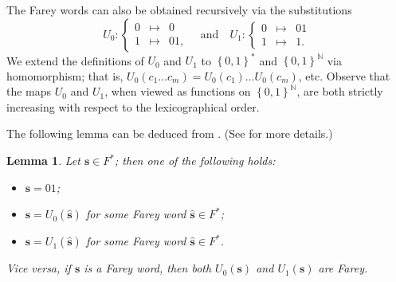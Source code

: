 \documentclass[11pt]{amsart}
\newtheorem{lemma}[theorem]{Lemma}
\theoremstyle{definition}
\theoremstyle{remark}
\numberwithin{equation}{section}
\newcommand{\N}{\ensuremath{\mathbb{N}}}
\newcommand{\F}{F^*}
\newcommand{\s}{ {\mathbf{s}}}
\newcommand{\w}{\mathbf{w}}
\newcommand{\set}[1]{\left\{#1\right\}}
\begin{document}


 The Farey words can also be obtained recursively via the substitutions
 \begin{equation} \label{eq:subs-01}
 U_0:\left\{\begin{array}{lll}
 0&\mapsto&0\\
 1&\mapsto&01,
 \end{array}\right.\quad\textrm{and}\quad U_1:\left\{
 \begin{array}{lll}
 0&\mapsto&01\\
 1&\mapsto&1.
 \end{array}\right.
 \end{equation}
We extend the definitions of $U_0$ and $U_1$ to $\set{0,1}^*$ and $\set{0,1}^\N$ via homomorphism; that is, $U_0(c_1\dots c_m)=U_0(c_1)\dots U_0(c_m)$, etc. Observe that the maps $U_0$ and $U_1$, when viewed as functions on $\set{0,1}^\N$, are both strictly increasing with respect to the lexicographical order.


The following lemma can be deduced from \cite[Propositions 2.3 and 2.9]{Carminati-Isola-Tiozzo-2018}. (See \cite[Section 2]{Allaart-Kong-2021} for more details.)

\begin{lemma} \label{lem:characterization-Farey-words}
   Let $\s\in\F$; then one of the following holds:
   \begin{itemize}
    \item[{\rm(i)}] $\s=01$;
		\item[{\rm(ii)}] $\s=U_0(\hat{\s})$ for some Farey word $\hat{\s}\in\F$;
    \item[{\rm(iii)}] $\s=U_1(\hat{\s})$ for some Farey word $\hat{\s}\in\F$.
	\end{itemize}
	Vice versa, if $\s$ is a Farey word, then both $U_0(\s)$ and $U_1(\s)$ are Farey.
\end{lemma}
\end{document}
